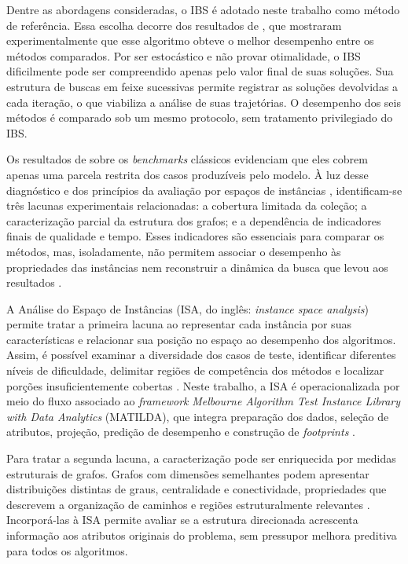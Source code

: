 Dentre as abordagens consideradas, o IBS é adotado neste trabalho como método
de referência. Essa escolha decorre dos resultados de
, que mostraram experimentalmente que esse
algoritmo obteve o melhor desempenho entre os métodos comparados. Por ser
estocástico e não provar otimalidade, o IBS dificilmente pode ser compreendido
apenas pelo valor final de suas soluções. Sua estrutura de buscas em feixe
sucessivas permite registrar as soluções devolvidas a cada iteração, o que
viabiliza a análise de suas trajetórias. O desempenho dos seis métodos é
comparado sob um mesmo protocolo, sem tratamento privilegiado do IBS.

Os resultados de  sobre os \textit{benchmarks}
clássicos evidenciam que eles cobrem apenas uma parcela restrita dos casos
produzíveis pelo modelo. À luz desse diagnóstico e dos princípios da avaliação por
espaços de instâncias \cite{MunozEtAl2018,SmithMilesMunoz2023}, identificam-se
três lacunas experimentais relacionadas: a cobertura limitada da coleção; a
caracterização parcial da estrutura dos grafos; e a dependência de indicadores
finais de qualidade e tempo. Esses indicadores são essenciais para comparar os
métodos, mas, isoladamente, não permitem associar o desempenho às propriedades
das instâncias nem reconstruir a dinâmica da busca que levou aos resultados
\cite{OchoaMalanBlum2021,SmithMilesMunoz2023}.

A Análise do Espaço de Instâncias (ISA, do inglês:
\textit{instance space analysis}) permite tratar a primeira lacuna ao
representar cada instância por suas características e relacionar sua posição no
espaço ao desempenho dos algoritmos. Assim, é possível examinar a diversidade dos
casos de teste, identificar diferentes níveis de dificuldade, delimitar regiões
de competência dos métodos e localizar porções insuficientemente cobertas
\cite{MunozEtAl2018,SmithMilesMunoz2023}. Neste trabalho, a ISA é operacionalizada
por meio do fluxo associado ao \textit{framework}
\textit{Melbourne Algorithm Test Instance Library
with Data Analytics} (MATILDA), que integra preparação dos dados, seleção de
atributos, projeção, predição de desempenho e construção de \textit{footprints}
\cite{SmithMilesMunoz2023}.

Para tratar a segunda lacuna, a caracterização pode ser enriquecida por medidas
estruturais de grafos. Grafos com
dimensões semelhantes podem apresentar distribuições distintas de graus,
centralidade e conectividade, propriedades que descrevem a organização de
caminhos e regiões estruturalmente relevantes \cite{Newman2018}. Incorporá-las à
ISA permite avaliar se a estrutura direcionada acrescenta informação aos
atributos originais do problema, sem pressupor melhora preditiva para todos os
algoritmos.

